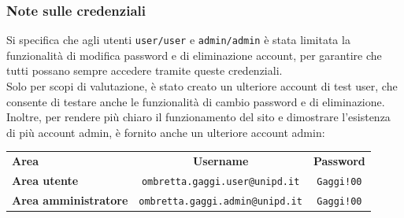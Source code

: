 \subsubsection*{Note sulle credenziali}
Si specifica che agli utenti \texttt{user/user} e \texttt{admin/admin} è stata limitata la funzionalità di modifica password e di eliminazione account, per garantire che tutti possano sempre accedere tramite queste credenziali.\\
Solo per scopi di valutazione, è stato creato un ulteriore account di test user, che consente di testare anche le funzionalità di cambio password e di eliminazione.\\
Inoltre, per rendere più chiaro il funzionamento del sito e dimostrare l'esistenza di più account admin, è fornito anche un ulteriore account admin:
\begin{center}
\begin{tabular}{|l|c|c|}
\hline
\rowcolor{brown}
\color{white}\textbf{Area} &
\color{white}\textbf{Username} &
\color{white}\textbf{Password} \\
\rowcolor{beige} 
\hline
\textbf{Area utente} & \texttt{ombretta.gaggi.user@unipd.it} & \texttt{Gaggi!00} \\
\rowcolor{beige} 
\hline
\textbf{Area amministratore} & \texttt{ombretta.gaggi.admin@unipd.it} & \texttt{Gaggi!00} \\
\hline
\end{tabular}
\end{center}
